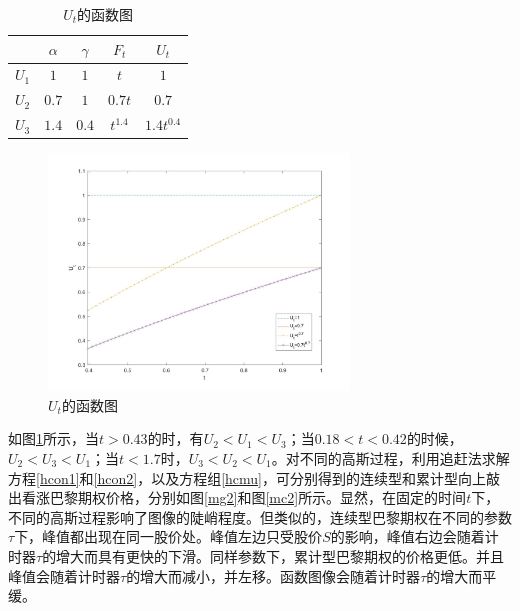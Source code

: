 \documentclass{ctexart} %
\begin{document}
\begin{table}[H]
\begin{minipage}{0.48\textwidth}
\caption{算例使用的协方差函数}
\centering
\label{t1}
\begin{tabular}{c|c|c|c|c}
\hline
 &$\alpha$&$\gamma$&$F_t$ & $U_t$ \\
\hline
$U_1$&$1$&$1$&$t$ & $1$ \\
$U_2$&$0.7$&$1$ & $0.7t$ & $0.7$ \\
$U_3$&$1.4$&$0.4$ & $t^{1.4}$ & $1.4t^{0.4}$ \\
\hline
\end{tabular}
\end{minipage}
\begin{minipage}{0.48\textwidth}
\centering
\begin{figure}[H]
\label{ut}
\centering
\includegraphics[width=8cm]{code/ut.jpg}
\caption{$U_t$的函数图}
\end{figure}
\end{minipage}
\end{table}

如图\ref{ut}所示，当$t>0.43$的时，有$U_2<U_1<U_3$；当$0.18<t<0.42$的时候，$U_2<U_3<U_1$；当$t<1.7$时，$U_3<U_2<U_1$。对不同的高斯过程，利用追赶法求解方程\eqref{hcon1}和\eqref{hcon2}，以及方程组\eqref{hcmu}，可分别得到的连续型和累计型向上敲出看涨巴黎期权价格，分别如图\ref{mg2}和图\ref{mc2}所示。显然，在固定的时间$t$下，不同的高斯过程影响了图像的陡峭程度。但类似的，连续型巴黎期权在不同的参数$\tau$下，峰值都出现在同一股价处。峰值左边只受股价$S$的影响，峰值右边会随着计时器$\tau$的增大而具有更快的下滑。同样参数下，累计型巴黎期权的价格更低。并且峰值会随着计时器$\tau$的增大而减小，并左移。函数图像会随着计时器$\tau$的增大而平缓。
\end{document}

